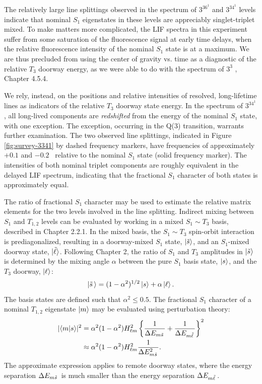 \documentclass[12pt]{mitthesis}
\begin{document}
The relatively large line splittings observed in the spectrum of
$3^36^1$  and $3^34^1$  levels indicate that nominal $S_1$
eigenstates in these levels are appreciably singlet-triplet mixed.  To
make matters more complicated, the LIF spectra in this experiment
suffer from some saturation of the fluorescence signal at early time
delays, when the relative fluorescence intensity of the nominal $S_1$
state is at a maximum. We are thus precluded from using the center of
gravity vs. time as a diagnostic of the relative $T_3$ doorway energy,
as we were able to do with the spectrum of $3^3$ , Chapter
4.5.4.

We rely, instead, on the positions and relative intensities of
resolved, long-lifetime lines as indicators of the relative $T_3$
doorway state energy.  In the spectrum of $3^34^1$ , all
long-lived components are \emph{redshifted} from the energy of the
nominal $S_1$ state, with one exception.  The exception, occurring in
the Q(3) transition, warrants further examination.  The two observed
line splittings, indicated in Figure \ref{fig:survey-3341} by dashed
frequency markers, have frequencies of approximately $+0.1$ and $-0.2$
\rcm\ relative to the nominal $S_1$ state (solid frequency marker).
The intensities of both nominal triplet components are roughly
equivalent in the delayed LIF spectrum, indicating that the fractional
$S_1$ character of both states is approximately equal.

The ratio of fractional $S_1$ character may be used to estimate the
relative matrix elements for the two levels involved in the line
splitting.  Indirect mixing between $S_1$ and $T_{1,2}$ levels can be
evaluated by working in a mixed $S_1 \sim T_3$ basis, described in
Chapter 2.2.1.  In the mixed basis, the $S_1 \sim T_3$ spin-orbit
interaction is prediagonalized, resulting in a doorway-mixed $S_1$
state, $\mathinner{|{\tilde{s}}\rangle}$, and an $S_1$-mixed doorway state,
$\mathinner{|{\tilde{\ell}}\rangle}$.  Following Chapter 2, the ratio of $S_1$ and
$T_3$ amplitudes in $\mathinner{|{\tilde{s}}\rangle}$ is determined by the mixing
angle $\alpha$ between the pure $S_1$ basis state, $\mathinner{|{s}\rangle}$, and the
$T_3$ doorway, $\mathinner{|{\ell}\rangle}$:
\begin{equation}
  \mathinner{|{\tilde{s}\,}\rangle} = (1-\alpha^2)^{1/2} \mathinner{|{s}\rangle} + \alpha \mathinner{|{\ell}\rangle}.
\end{equation}
The basis states are defined such that $\alpha^2 \leq 0.5$.
The fractional $S_1$ character of a nominal $T_{1,2}$ eigenstate
$\mathinner{|{m}\rangle}$ may be evaluated using perturbation theory:
\begin{equation}
  \label{eq:s-char}
  \begin{split}
    \lvert \mathinner{\langle{m|s}\rangle} \rvert^2 
    &= \alpha^2 (1-\alpha^2) H_{\ell m}^2
    \left \lbrace 
      \frac{1}{\Delta E_{m \tilde{s}\,}} +
      \frac{1}{\Delta E_{m \tilde{\ell}\,}}
    \right \rbrace ^2\\
    &\approx \alpha^2 (1-\alpha^2) H_{\ell m}^2
    \frac{1}{\Delta E_{m \tilde{s}\,}^2}.
  \end{split}
\end{equation}
The approximate expression applies to remote doorway states, where the
energy separation $\Delta E_{m \tilde{s}\,}$ is much smaller than the energy
separation $\Delta E_{m \tilde{\ell}\,}$.  
\end{document}
